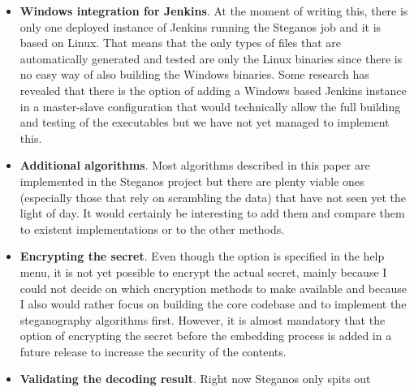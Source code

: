 \begin{itemize}
	\item \textbf{Windows integration for Jenkins}. At the moment of writing this, there is only one deployed instance of Jenkins running the Steganos job and it is based on Linux. That means that the only types of files that are automatically generated and tested are only the Linux binaries since there is no easy way of also building the Windows binaries. Some research has revealed that there is the option of adding a Windows based Jenkins instance in a master-slave configuration that would technically allow the full building and testing of the executables but we have not yet managed to implement this. 
	\item \textbf{Additional algorithms}. Most algorithms described in this paper are implemented in the Steganos project but there are plenty viable ones (especially those that rely on scrambling the data) that have not seen yet the light of day. It would certainly be interesting to add them and compare them to existent implementations or to the other methods.
	\item \textbf{Encrypting the secret}. Even though the option is specified in the help menu, it is not yet possible to encrypt the actual secret, mainly because I could not decide on which encryption methods to make available and because I also would rather focus on building the core codebase and to implement the steganography algorithms first. However, it is almost mandatory that the option of encrypting the secret before the embedding process is added in a future release to increase the security of the contents.
	\item \textbf{Validating the decoding result}. Right now Steganos only spits out
\end{itemize}
